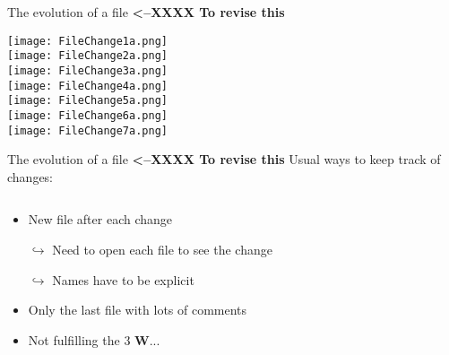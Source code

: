 \documentclass[xcolor=x11names,compress]{beamer}
\renewcommand{\(}{\begin{columns}}
\renewcommand{\)}{\end{columns}}
\newcommand{\<}[1]{\begin{column}{#1}}
\renewcommand{\>}{\end{column}}
\begin{document}
\begin{frame}{The evolution of a file \textcolor[rgb]{1.00,0.00,0.00}{\textbf{<--XXXX To revise this}} }
\begin{center}
\begin{itemize}
    {\texttt{[image: FileChange1a.png]} \\ }
    {\texttt{[image: FileChange2a.png]} \\ }
    {\texttt{[image: FileChange3a.png]} \\ }
    {\texttt{[image: FileChange4a.png]} \\ }
    {\texttt{[image: FileChange5a.png]} \\ }
    {\texttt{[image: FileChange6a.png]} \\ }
    {\texttt{[image: FileChange7a.png]} \\ }
\end{itemize}
\end{center}
\end{frame}

\begin{frame}{The evolution of a file  \textcolor[rgb]{1.00,0.00,0.00}{\textbf{<--XXXX To revise this}} }
Usual ways to keep track of changes:
\pause
\begin{columns}[t]
\begin{column}{0.6\textwidth}
\begin{itemize}[<+->]
        \item New file after each change
        \item[$\hookrightarrow$] Need to open each file to see the change
        \item[$\hookrightarrow$] Names have to be explicit
        \item Only the last file with lots of comments
        \item Not fulfilling the 3 \textcolor{siap}{\textbf{W}}...

    \end{itemize}
 \end{column}
  \begin{column}{0.4\textwidth}
    \begin{center}
    \begin{itemize}

    \end{itemize}
    \end{center}
  \end{column}
\end{columns}
\end{frame}
\end{document}
